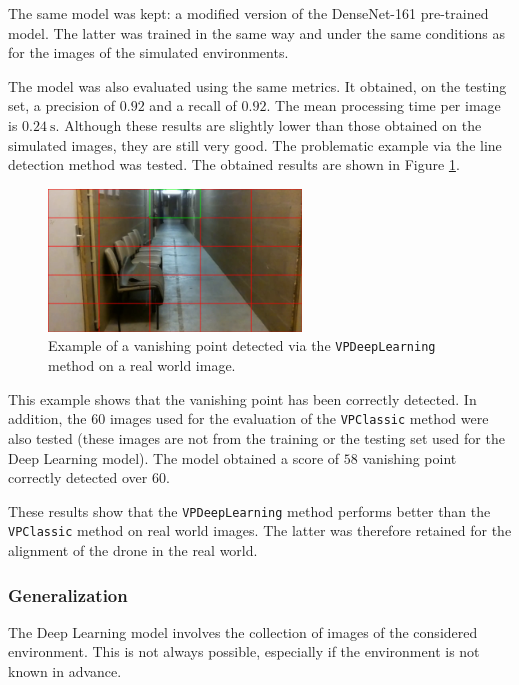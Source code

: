 The same model was kept: a modified version of the DenseNet-161 pre-trained model. The latter was trained in the same way and under the same conditions as for the images of the simulated environments.

The model was also evaluated using the same metrics. It obtained, on the testing set, a precision of $\num{0.92}$ and a recall of $\num{0.92}$. The mean processing time per image is $\SI{0.24}{\second}$. Although these results are slightly lower than those obtained on the simulated images, they are still very good. The problematic example via the line detection method was tested. The obtained results are shown in Figure \ref{fig:07.vpdeeplearning.example}.

\begin{figure}[H]
    \centering
    \includegraphics[width=0.6\textwidth]{resources/png/07/vanishing-point/vpdeeplearning/0.png}
    \caption{Example of a vanishing point detected via the \texttt{VPDeepLearning} method on a real world image.}
    \label{fig:07.vpdeeplearning.example}
\end{figure}

This example shows that the vanishing point has been correctly detected. In addition, the $\num{60}$ images used for the evaluation of the \texttt{VPClassic} method were also tested (these images are not from the training or the testing set used for the Deep Learning model). The model obtained a score of $\num{58}$ vanishing point correctly detected over $\num{60}$.

These results show that the \texttt{VPDeepLearning} method performs better than the \texttt{VPClassic} method on real world images. The latter was therefore retained for the alignment of the drone in the real world.

\subsubsection{Generalization}

The Deep Learning model involves the collection of images of the considered environment. This is not always possible, especially if the environment is not known in advance.

